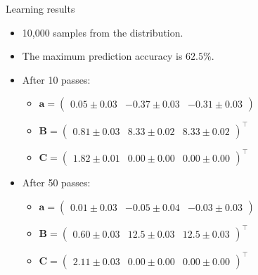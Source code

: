 \documentclass{beamer}
\begin{document}
\begin{frame}{Learning results}
  \begin{itemize}
    \item 10,000 samples from the distribution.
    \item The maximum prediction accuracy is $62.5\%$.
    \item After 10 passes:
      \begin{itemize}
        \item $\mathbf{a} = \left( \begin{array}{ccc} 0.05 \pm 0.03 & -0.37 \pm 0.03 & -0.31 \pm 0.03 \end{array} \right)$
        \item $\mathbf{B} = \left( \begin{array}{ccc} 0.81 \pm 0.03 & 8.33 \pm 0.02 & 8.33 \pm 0.02 \end{array}\right)^{\intercal}$
        \item $\mathbf{C} = \left( \begin{array}{ccc} 1.82 \pm 0.01 & 0.00 \pm 0.00 & 0.00 \pm 0.00 \end{array}\right)^{\intercal}$
      \end{itemize}
    \item After 50 passes:
      \begin{itemize}
        \item $\mathbf{a} = \left( \begin{array}{ccc} 0.01 \pm 0.03 & -0.05 \pm 0.04 & -0.03 \pm 0.03 \end{array} \right)$
        \item $\mathbf{B} = \left( \begin{array}{ccc} 0.60 \pm 0.03 & 12.5 \pm 0.03 & 12.5 \pm 0.03 \end{array}\right)^{\intercal}$
        \item $\mathbf{C} = \left( \begin{array}{ccc} 2.11 \pm 0.03 & 0.00 \pm 0.00 & 0.00 \pm 0.00 \end{array}\right)^{\intercal}$
      \end{itemize}
  \end{itemize}
\end{frame}
\end{document}
